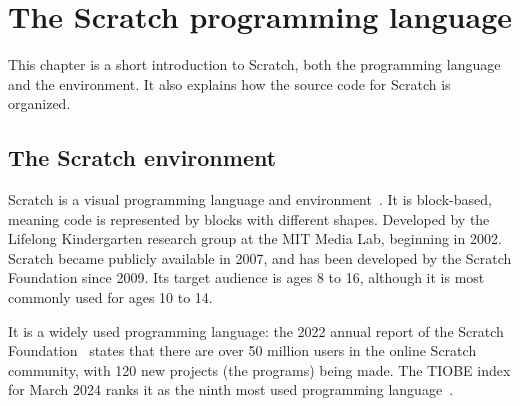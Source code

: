 \documentclass[../main]{subfiles}
\begin{document}
\chapter{The Scratch programming language}\label{ch:scratch-the-programming-language}


This chapter is a short introduction to Scratch, both the programming language and the environment.
It also explains how the source code for Scratch is organized.

\section{The Scratch environment}\label{sec:scratch-environment}

Scratch is a visual programming language and environment~\autocite{resnickScratchProgrammingAll2009}.
It is block-based, meaning code is represented by blocks with different shapes.
Developed by the Lifelong Kindergarten research group at the MIT Media Lab, beginning in 2002.
Scratch became publicly available in 2007, and has been developed by the Scratch Foundation since 2009.
Its target audience is ages 8 to 16, although it is most commonly used for ages 10 to 14.

It is a widely used programming language: the 2022 annual report of the Scratch Foundation~\autocite{GrowingGlobalCreative2022} states that there are over 50 million users in the online Scratch community, with 120 new projects (the programs) being made.
The TIOBE index for March 2024 ranks it as the ninth most used programming language~\autocite{TIOBEIndexMarch2024}.
\end{document}
